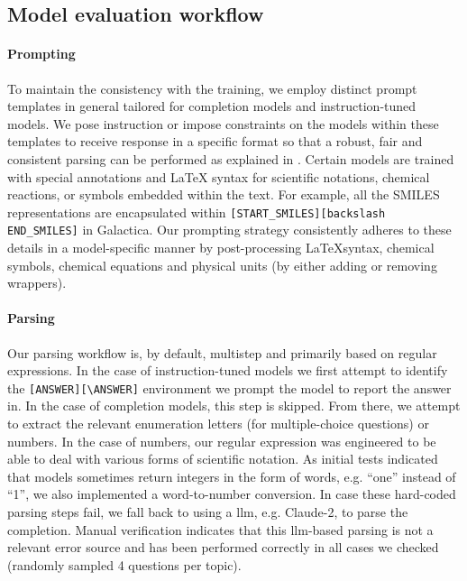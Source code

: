 \documentclass[11pt, oneside]{article}
\begin{document}
\subsection{Model evaluation workflow}

\paragraph{Prompting}

To maintain the consistency with the training, we employ distinct prompt templates in general tailored for completion models and instruction-tuned models. 
We pose instruction or impose constraints on the models within these templates to receive response in a specific format so that a robust, fair and consistent parsing can be performed as explained in .
Certain models are trained with special annotations and LaTeX syntax for scientific notations, chemical reactions, or symbols embedded within the text. 
For example, all the SMILES representations are encapsulated within \texttt{[START\_SMILES][\text backslash END\_SMILES]} in Galactica\cite{taylor2022galactica}.
Our prompting strategy consistently adheres to  these details in a model-specific manner by post-processing \LaTeX syntax, chemical symbols, chemical equations and physical units (by either adding or removing wrappers).



\paragraph{Parsing}
Our parsing workflow is, by default, multistep and primarily based on regular expressions.
In the case of instruction-tuned models we first attempt to identify the \texttt{[ANSWER][\textbackslash ANSWER]} environment we prompt the model to report the answer in.
In the case of completion models, this step is skipped. From there, we attempt to extract the relevant enumeration letters (for multiple-choice questions) or numbers.
In the case of numbers, our regular expression was engineered to be able to deal with various forms of scientific notation.
As initial tests indicated that models sometimes return integers in the form of words, e.g. \enquote{one} instead of \enquote{1}, we also implemented a word-to-number conversion.
In case these hard-coded parsing steps fail, we fall back to using a \gls{llm}, e.g. Claude-2, to parse the completion.
Manual verification indicates that this \gls{llm}-based parsing is not a relevant error source and has been performed correctly in all cases we checked (randomly sampled 4 questions per topic).
\end{document}
